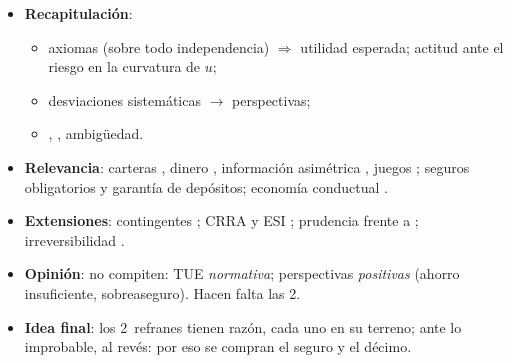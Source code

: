 \documentclass{article}
\begin{document}
\begin{columnas}
\begin{itemize}
\item \textbf{Recapitulación}:
  \begin{itemize}
  \item axiomas (sobre todo independencia) $\Rightarrow$ utilidad esperada; actitud ante el riesgo en la curvatura de $u$;
  \item desviaciones sistemáticas $\to$ perspectivas;
  \item {}, , ambigüedad.
  \end{itemize}
\item \textbf{Relevancia}: carteras , dinero , información asimétrica , juegos ; seguros obligatorios y garantía de depósitos; economía conductual .
\item \textbf{Extensiones}: contingentes ; CRRA y ESI ; prudencia frente a  ; irreversibilidad .
\item \textbf{Opinión}: no compiten: TUE \emph{normativa}; perspectivas \emph{positivas} (ahorro insuficiente, sobreaseguro). Hacen falta las 2.
\item \textbf{Idea final}: los 2~refranes tienen razón, cada uno en su terreno; ante lo improbable, al revés: por eso se compran el seguro y el décimo.
\end{itemize}


\end{columnas}
\end{document}
